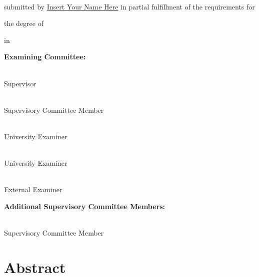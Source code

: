 \documentclass[
]{article}
\begin{document}
\vspace{5mm}

\noindent\underline{}\\
\vspace{2mm}

submitted by \underline{Insert Your Name Here} in partial fulfillment of the requirements for

the degree of \noindent\underline{}

in \noindent\underline{}

\vspace{5mm}

\textbf{Examining Committee:}

\noindent\underline{}\\
Supervisor

\noindent\underline{}\\
Supervisory Committee Member

\noindent\underline{}\\
University Examiner

\noindent\underline{}\\
University Examiner

\noindent\underline{}\\
External Examiner

\textbf{Additional Supervisory Committee Members:}

\noindent\underline{}\\
Supervisory Committee Member

\clearpage

\setlength{\parindent}{4em} 
\linespread{1}
\doublespacing

\section*{Abstract}
\end{document}
